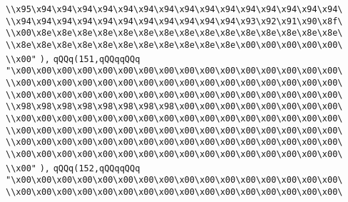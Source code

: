 \verb|\\x95\x94\x94\x94\x94\x94\x94\x94\x94\x94\x94\x94\x94\x94\x94\x94\|\newline
\verb|\\x94\x94\x94\x94\x94\x94\x94\x94\x94\x94\x94\x93\x92\x91\x90\x8f\|\newline
\verb|\\x00\x8e\x8e\x8e\x8e\x8e\x8e\x8e\x8e\x8e\x8e\x8e\x8e\x8e\x8e\x8e\|\newline
\verb|\\x8e\x8e\x8e\x8e\x8e\x8e\x8e\x8e\x8e\x8e\x8e\x00\x00\x00\x00\x00\|\newline
\verb|\\x00"|\newline
\verb|),|\newline
\verb|qQQq(151,qQQqqQQq|\newline
\verb|"\x00\x00\x00\x00\x00\x00\x00\x00\x00\x00\x00\x00\x00\x00\x00\x00\|\newline
\verb|\\x00\x00\x00\x00\x00\x00\x00\x00\x00\x00\x00\x00\x00\x00\x00\x00\|\newline
\verb|\\x00\x00\x00\x00\x00\x00\x00\x00\x00\x00\x00\x00\x00\x00\x00\x00\|\newline
\verb|\\x98\x98\x98\x98\x98\x98\x98\x98\x00\x00\x00\x00\x00\x00\x00\x00\|\newline
\verb|\\x00\x00\x00\x00\x00\x00\x00\x00\x00\x00\x00\x00\x00\x00\x00\x00\|\newline
\verb|\\x00\x00\x00\x00\x00\x00\x00\x00\x00\x00\x00\x00\x00\x00\x00\x00\|\newline
\verb|\\x00\x00\x00\x00\x00\x00\x00\x00\x00\x00\x00\x00\x00\x00\x00\x00\|\newline
\verb|\\x00\x00\x00\x00\x00\x00\x00\x00\x00\x00\x00\x00\x00\x00\x00\x00\|\newline
\verb|\\x00"|\newline
\verb|),|\newline
\verb|qQQq(152,qQQqqQQq|\newline
\verb|"\x00\x00\x00\x00\x00\x00\x00\x00\x00\x00\x00\x00\x00\x00\x00\x00\|\newline
\verb|\\x00\x00\x00\x00\x00\x00\x00\x00\x00\x00\x00\x00\x00\x00\x00\x00\|\newline
